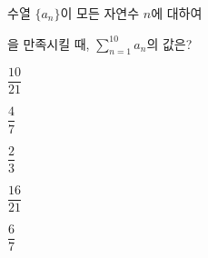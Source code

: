 수열 $\{a_n\}$이 모든 자연수 $n$에 대하여 \par\smallskip{}\par\smallskip\noindent 을 만족시킬 때, $\displaystyle\sum_{n=1}^{10}a_n$의 값은?
\begin{choices32}{\rule[-3ex]{0pt}{8ex}$\dfrac{10}{21}$}{\rule[-3ex]{0pt}{8ex}$\dfrac{4}{7}$}{\rule[-3ex]{0pt}{8ex}$\dfrac{2}{3}$}{\rule[-3ex]{0pt}{8ex}$\dfrac{16}{21}$}{\rule[-3ex]{0pt}{8ex}$\dfrac{6}{7}$}\end{choices32}
